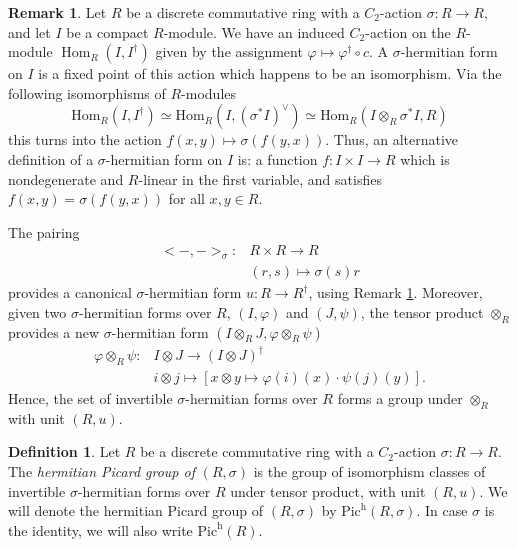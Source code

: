 \documentclass{article}
\theoremstyle{definition}
\newtheorem{definition}[equation]{Definition}
\newtheorem{remark}[equation]{Remark}
\begin{document}
\begin{remark}
    \label{remark:hermitian_forms_as_fixed_points}
    Let $ R $ be a discrete commutative ring with a $ C_2 $-action $ \sigma \colon R \to R $, and let $I$ be a compact $R$-module. We have an induced $C_2$-action on the $R$-module $\operatorname{Hom}_R(I,I^\dag)$ given by the assignment $\varphi\mapsto \varphi^\dag\circ c$. A $\sigma$-hermitian form on $I$ is a fixed point of this action which happens to be an isomorphism. Via the following isomorphisms of $R$-modules $$\text{Hom}_R(I,I^\dag)\simeq \text{Hom}_R(I,(\sigma^*I)^\vee)\simeq \text{Hom}_R(I\otimes_R \sigma^*I,R)$$ this turns into the action $f(x,y)\mapsto \sigma(f(y,x))$. Thus, an alternative definition of a $\sigma$-hermitian form on $I$ is: a function $f:I\times I\rightarrow R$ which is nondegenerate and $R$-linear in the first variable, and satisfies $f(x,y)=\sigma(f(y,x))$ for all $x,y\in R$.
\end{remark}

The pairing 
\begin{align*}
    <-,->_\sigma: & R\times  R\rightarrow R\\
    & (r,s)\mapsto \sigma(s)r
\end{align*} 
provides a canonical $\sigma$-hermitian form $u:R\rightarrow R^\dagger$, using Remark \ref{remark:hermitian_forms_as_fixed_points}. Moreover, given two $\sigma$-hermitian forms over $R$, $(I,\varphi)$ and $(J,\psi)$, the tensor product $\otimes_R$ provides a new $\sigma$-hermitian form $(I\otimes_R J, \varphi \otimes_R \psi)$
\begin{align*}
    \varphi\otimes_R \psi: & I\otimes J \rightarrow (I\otimes J)^\dagger\\
    & i\otimes j\mapsto \left[x\otimes y \mapsto \varphi(i)(x)\cdot \psi(j)(y)\right].
\end{align*}  
Hence, the set of invertible $\sigma$-hermitian forms over $R$ forms a group under $\otimes_R$ with unit $(R,u)$.

\begin{definition}
    \label{definition:hermetian_picard_group}
    Let $R$ be a discrete commutative ring with a $C_2$-action $\sigma: R \rightarrow R$. The \emph{hermitian Picard group of} $(R,\sigma)$ is the group of isomorphism classes of invertible $\sigma$-hermitian forms over $R$ under tensor product, with unit $(R,u)$. We will denote the hermitian Picard group of $(R,\sigma)$ by $\text{Pic}^\text{h}(R,\sigma)$. In case $\sigma$ is the identity, we will also write $\text{Pic}^\text{h}(R)$.
\end{definition}
\end{document}
